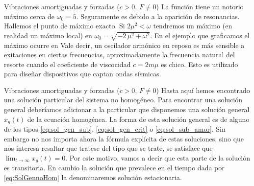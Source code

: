 \documentclass[handout,hyperref={colorlinks=true}]{beamer}
\renewcommand{\emph}[1]{\textcolor[rgb]{1,0,0}{#1}}
\begin{document}
 \begin{frame}{ Vibraciones amortiguadas y forzadas ($c>0$, $F\neq 0$) } 
La función tiene un notorio máximo  cerca de $\omega_0=5$. Seguramente es debido a la aparición de resonancias. Hallemos el punto de máximo exacto. 
\lstI
Si $2\mu^2<\omega$ tendremos un máximo (en realidad un máximo local) en  $\omega_{0} = \sqrt{-2 \, \mu^{2} + \omega^{2}}$. En el ejemplo que graficamos
el máximo ocurre en
\lstII
Vale decir, un oscilador armónico en reposo es más sensible a exitaciones en ciertas frecuencias, aproximadamente la frecuencia
natural del resorte cuando el coeficiente de viscocidad $c=2m\mu$ es chico. Esto es utilizado para diseñar dispositivos que captan ondas sísmicas.


\end{frame}

 \begin{frame}{ Vibraciones amortiguadas y forzadas ($c>0$, $F\neq 0$) } 
 Hasta aquí hemos encontrado una solución particular del sistema no homogéneo. Para encontrar una solución general deberíamos adicionar a la particular que disponemos
 una solución general $x_g(t)$  de la ecuación homogénea.  La forma de esta solución general es de alguno de los tipos \ref{eq:sol_gen_sub},
 \ref{eq:sol_gen_crit} o \ref{eq:sol_sub_amor}. Sin embargo no nos importa ahora la fórmula explícita de estas soluciones, sino que nos interesa resaltar que 
 tratese del tipo que se trate, se satisface que $\lim_{t\to\infty}x_g(t)=0$. Por este motivo, vamos a decir que esta parte de la solución es 
 \emph{transitoria}. En cambio la solución que prevalece en el tiempo dada por \eqref{eq:SolGennoHom} la denominaremos solución \emph{estacionaria}.
 
  
\end{frame}
 
\end{document}
